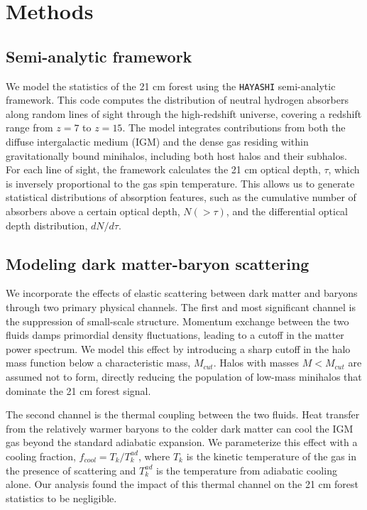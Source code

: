 \documentclass[]{article}
\begin{document}
\section{Methods}
\label{sec:methods}
\subsection{Semi-analytic framework}

We model the statistics of the 21 cm forest using the \texttt{HAYASHI} semi-analytic framework. This code computes the distribution of neutral hydrogen absorbers along random lines of sight through the high-redshift universe, covering a redshift range from $z=7$ to $z=15$. The model integrates contributions from both the diffuse intergalactic medium (IGM) and the dense gas residing within gravitationally bound minihalos, including both host halos and their subhalos. For each line of sight, the framework calculates the 21 cm optical depth, $\tau$, which is inversely proportional to the gas spin temperature. This allows us to generate statistical distributions of absorption features, such as the cumulative number of absorbers above a certain optical depth, $N(>\tau)$, and the differential optical depth distribution, $dN/d\tau$.

\subsection{Modeling dark matter-baryon scattering}

We incorporate the effects of elastic scattering between dark matter and baryons through two primary physical channels. The first and most significant channel is the suppression of small-scale structure. Momentum exchange between the two fluids damps primordial density fluctuations, leading to a cutoff in the matter power spectrum. We model this effect by introducing a sharp cutoff in the halo mass function below a characteristic mass, $M_{cut}$. Halos with masses $M < M_{cut}$ are assumed not to form, directly reducing the population of low-mass minihalos that dominate the 21 cm forest signal.

The second channel is the thermal coupling between the two fluids. Heat transfer from the relatively warmer baryons to the colder dark matter can cool the IGM gas beyond the standard adiabatic expansion. We parameterize this effect with a cooling fraction, $f_{cool} = T_k / T_k^{ad}$, where $T_k$ is the kinetic temperature of the gas in the presence of scattering and $T_k^{ad}$ is the temperature from adiabatic cooling alone. Our analysis found the impact of this thermal channel on the 21 cm forest statistics to be negligible.
\end{document}
